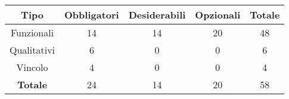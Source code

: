 \begin{table}[h!]
    \centering
    \renewcommand{\arraystretch}{1.6} 
    \begin{tabularx}{0.67\textwidth}{|c|c|c|c|c|} \hline
    \rowcolor[HTML]{FFD700} 
    \textbf{Tipo} & \textbf{Obbligatori} & \textbf{Desiderabili} & \textbf{Opzionali} & \textbf{Totale} \\ \hline
    Funzionali & 14 & 14 & 20 & 48 \\ \hline
    Qualitativi & 6 & 0 & 0 & 6 \\ \hline
    Vincolo & 4 & 0 & 0 & 4 \\ \hline
    \rowcolor[HTML]{FFD700} 
    \textbf{Totale} & 24 & 14 & 20 & 58 \\ \hline
    \end{tabularx}
\end{table}